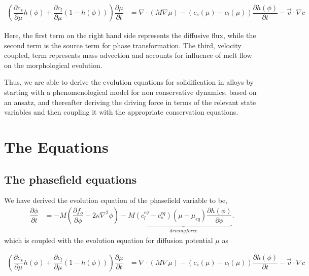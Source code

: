 \documentclass[a4paper]{report}
\begin{document}
 \begin{align}
 \left(\dfrac{\partial c_s}{\partial \mu}h\left(\phi\right) + \dfrac{\partial c_l}{\partial \mu}(1-h\left(\phi\right))\right)
 \dfrac{\partial \mu}{\partial t} &= \nabla \cdot \left(M\nabla\mu\right) 
 - \left(c_s\left(\mu\right) - c_l \left(\mu\right)\right)\dfrac{\partial h\left(\phi\right)}{\partial t} - \vec{v}\cdot\nabla c
 \label{Mass-conservation-alloys}
 \end{align}
 
 Here, the first term on the right hand side represents the diffusive flux, while
 the second term is the source term for phase transformation. The third, velocity coupled,
 term represents mass advection and accounts for influence of melt flow on the morphological 
 evolution. 

 Thus, we are able to derive the evolution equations for solidification in alloys by starting 
 with a phenomenological model for non conservative dynamics, based on an ansatz, and thereafter 
 deriving the driving force in terms of the relevant state variables and then coupling it with the 
 appropriate conservation equations.


\chapter{The Equations}
\section{The phasefield equations}
We have derived the evolution equation of the phasefield variable to be,
  \begin{align}
  \dfrac{\partial \phi}{\partial t} &= -M \left(\dfrac{\partial f_o}{\partial \phi} - 2\kappa\nabla^{2}\phi\right)  
					-M\underbrace{(c_l^{eq} - c_s^{eq})\left(\mu-\mu_{eq}\right)\dfrac{\partial h\left(\phi\right)}{\partial \phi}}_{driving force}.
  \end{align}
which is coupled with the evolution equation for diffusion potential $\mu$ as

 \begin{align}
 \left(\dfrac{\partial c_s}{\partial \mu}h\left(\phi\right) + \dfrac{\partial c_l}{\partial \mu}(1-h\left(\phi\right))\right)
 \dfrac{\partial \mu}{\partial t} &= \nabla \cdot \left(M\nabla\mu\right) 
 - \left(c_s\left(\mu\right) - c_l \left(\mu\right)\right)\dfrac{\partial h\left(\phi\right)}{\partial t} - \vec{v}\cdot\nabla c
 \label{Mass-conservation-alloys}
 \end{align}
\end{document}

